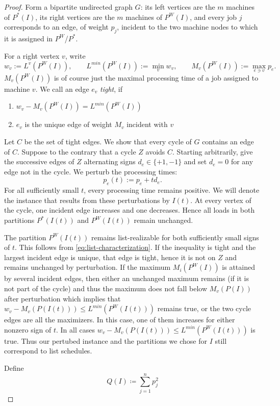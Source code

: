 \documentclass[11pt]{article}
\begin{document}
\begin{proof}
Form a bipartite undirected graph $G$: its left vertices are
the $m$ machines of $P^{*}(I)$, its right vertices are the $m$ machines of
$P^W(I)$, and every job $j$ corresponds to an edge, of weight $p_j$, incident to the two machine 
nodes to which it is assigned in $P^{W}$/$P^{*}$.

For a right vertex $v$, write
\[
 w_v:=L^v(P^W(I)),
 \qquad L^{min}(P^W(I)):=\min_v w_v,
 \qquad M_v(P^W(I)):=\max_{e\ni v} p_e.
\]
$M_v(P^W(I))$ is of course just the maximal processing time of a job assigned to machine $v$.
We call an edge $e_v$ \emph{tight}, if
\begin{enumerate}
     \item $ w_v-M_v(P^W(I))=L^{min}(P^{W}(I))$ \label{eq:critical}
     \item $e_v$ is the unique edge of weight $M_v$ incident with $v$
\end{enumerate}


Let $C$ be the set of tight edges.
We show that every cycle of $G$ contains an edge of $C$.  Suppose to the
contrary that a cycle $Z$ avoids $C$. Starting arbitrarily, give the successive edges of $Z$
alternating signs $d_e\in\{+1,-1\}$ and set $d_e=0$ for any edge not in the cycle.
We perturb the processing times:
\[
 p_e(t):=p_e+t d_e.
\]
For all sufficiently small $t$, every processing time remains
positive. We will denote the instance that results from these perturbations by
$I(t)$. At every vertex of the cycle, one incident edge increases
and one decreases.  Hence all loads in both partitions $P^{*}(I(t))$ and
$P^W(I(t))$ remain unchanged.

The partition $P^W(I(t))$ remains list-realizable for both sufficiently
small signs of $t$.  This follows from
\eqref{eq:list-characterization}.
If the inequality is tight and the largest incident edge is unique,
that edge is tight, hence it is not on $Z$ and remains
unchanged by perturbation. If the maximum $M_i(P^W(I))$ is attained by several incident edges, then
either an unchanged maximum remains (if it is not part of the cycle) and thus the maximum does not
fall below $M_v(P(I))$ after perturbation which implies that $w_v-M_v(P(I(t)))\leq L^{min}(P^{W}(I(t)))$ remains true, or the two cycle edges are all the
maximizers. In this case, one of them increases for either nonzero
sign of $t$.  In all cases
$w_v-M_v(P(I(t)))\leq L^{min}(P^{W}(I(t)))$ is true. 
Thus our pertubed instance and the partitions we chose for $I$ still correspond to list schedules.

Define
\[
Q(I)\coloneq \sum_{j=1}^{n} p^2_j
\]


\end{proof}
\end{document}
